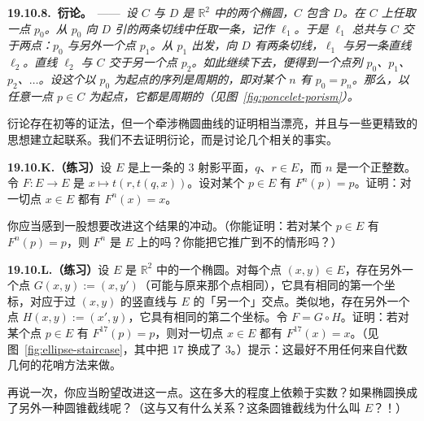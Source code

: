 \textbf{19.10.8.\ \trPoncelet{}衍论。}\ ——\ \emph{设 $C$ 与 $D$ 是 $\mathbb{R}^2$ 中的两个椭圆，$C$ 包含 $D$。在 $C$ 上任取一点 $p_0$。从 $p_0$ 向 $D$ 引的两条切线中任取一条，记作 $\ell_1$。于是 $\ell_1$ 总共与 $C$ 交于两点：$p_0$ 与另外一个点 $p_1$。从 $p_1$ 出发，向 $D$ 有两条切线，$\ell_1$ 与另一条直线 $\ell_2$。直线 $\ell_2$ 与 $C$ 交于另一个点 $p_2$。如此继续下去，便得到一个点列 $p_0$、$p_1$、$p_2$、$\dots$。设这个以 $p_0$ 为起点的序列是周期的，即对某个 $n$ 有 $p_0=p_n$。那么，以任意一点 $p\in C$ 为起点，它都是周期的（见图~\ref{fig:poncelet-porism}）。}

\trPoncelet{}衍论存在初等的证法，但一个牵涉椭圆曲线的证明相当漂亮，并且与一些更精致的思想建立起联系。我们不去证明\trPoncelet{}衍论，而是讨论几个相关的事实。

\textbf{19.10.K.（练习）}\quad 设 $E$ 是\trAlgClosedField{}上一条\trSmooth{}的\trDegree{} $3$ 射影平面\trCurve，$q$、$r\in E$，而 $n$ 是一个正整数。令 $F\colon E\to E$ 是\trMorphism{} $x\mapsto t(r,t(q,x))$。设对某个\trClosedPoint{} $p\in E$ 有 $F^n(p)=p$。证明：对一切点 $x\in E$ 都有 $F^n(x)=x$。

你应当感到一股想要改进这个结果的冲动。（你能证明：若对某个 $p\in E$ 有 $F^n(p)=p$，则 $F^n$ 是 $E$ 上的\trIdMorphism{}吗？你能把它推广到\trBaseField{}不\trAlgClosed{}的情形吗？）

\textbf{19.10.L.（练习）}\quad 设 $E$ 是 $\mathbb{R}^2$ 中的一个椭圆。对每个点 $(x,y)\in E$，存在另外一个点 $G(x,y):=(x,y')$（可能与原来那个点相同），它具有相同的第一个坐标，对应于过 $(x,y)$ 的竖直线与 $E$ 的「另一个」交点。类似地，存在另外一个点 $H(x,y):=(x',y)$，它具有相同的第二个坐标。令 $F=G\circ H$。证明：若对某个点 $p\in E$ 有 $F^{17}(p)=p$，则对一切点 $x\in E$ 都有 $F^{17}(x)=x$。（见图~\ref{fig:ellipse-staircase}，其中把 $17$ 换成了 $3$。）提示：这最好不用任何来自代数几何的花哨方法来做。

再说一次，你应当盼望改进这一点。这在多大的程度上依赖于实数？如果椭圆换成了另外一种圆锥截线呢？（这与\trEllipticCurve{}又有什么关系？这条圆锥截线为什么叫 $E$？！）


